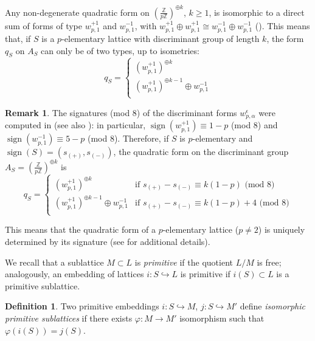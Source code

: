 \documentclass{amsart}
\theoremstyle{definition}
\newtheorem{rem}[theorem]{Remark}
\newtheorem{defi}[theorem]{Definition}
\newcommand{\ra}{\rightarrow}
\newcommand{\IZ}{\mathbb{Z}}
\DeclareMathOperator{\signt}{sign}
\begin{document}
Any non-degenerate quadratic form on $\left( \frac{\IZ}{p \IZ}\right)^{\oplus k}$, $k \geq 1$, is isomorphic to a direct sum of forms of type $w^{+1}_{p,1}$ and $w^{-1}_{p,1}$, with $w^{+1}_{p,1} \oplus w^{+1}_{p,1} \cong w^{-1}_{p,1} \oplus w^{-1}_{p,1}$ (\cite[Proposition 1.8.2]{nikulin}). This means that, if $S$ is a $p$-elementary lattice with discriminant group of length $k$, the form $q_S$ on $A_S$ can only be of two types, up to isometries:
\begin{equation*}
 q_S = \begin{cases}
\left( w^{+1}_{p,1} \right)^{\oplus k}\\
\left( w^{+1}_{p,1} \right)^{\oplus k-1} \oplus w^{-1}_{p,1}\\
\end{cases}
\end{equation*}

\begin{rem}\label{forme su S}
The signatures (mod $8$) of the discriminant forms $w^{\epsilon}_{p,\alpha}$ were computed in \cite{wall} (see also \cite[Proposition 1.11.2]{nikulin}): in particular, $\signt(w^{+1}_{p,1}) \equiv 1-p$ (mod $8$) and $\signt(w^{-1}_{p,1}) \equiv 5-p$ (mod $8$). Therefore, if $S$ is $p$-elementary and $\signt(S) = (s_{(+)}, s_{(-)})$, the quadratic form on the discriminant group $A_S = \left( \frac{\IZ}{p \IZ}\right)^{\oplus k}$ is
\begin{equation}
 q_S = \begin{cases} \label{form q_S}
\left( w^{+1}_{p,1} \right)^{\oplus k}  & \text{if } s_{(+)}-s_{(-)} \equiv k(1-p) \text{ (mod } 8 \text{)}\\
\left( w^{+1}_{p,1} \right)^{\oplus k-1} \oplus w^{-1}_{p,1}  & \text{if } s_{(+)}-s_{(-)} \equiv k(1-p) +4 \text{ (mod } 8 \text{)}\\
\end{cases}
\end{equation}

This means that the quadratic form of a $p$-elementary lattice ($p \neq 2$) is uniquely determined by its signature (see \cite[\S 1]{rudakov-shafarevich} for additional details).
\end{rem}

We recall that a sublattice $M \subset L$ is \emph{primitive} if the quotient $L/M$ is free; analogously, an embedding of lattices $i: S \hookrightarrow L$ is primitive if $i(S)\subset L$ is a primitive sublattice.

\begin{defi}\label{def isomorph}
Two primitive embeddings $i:S \hookrightarrow M$, $j:S \hookrightarrow M'$  define \emph{isomorphic primitive sublattices} if there exists $\varphi: M \ra M'$ isomorphism such that $\varphi(i(S))=j(S)$. 
\end{defi}
\end{document}
